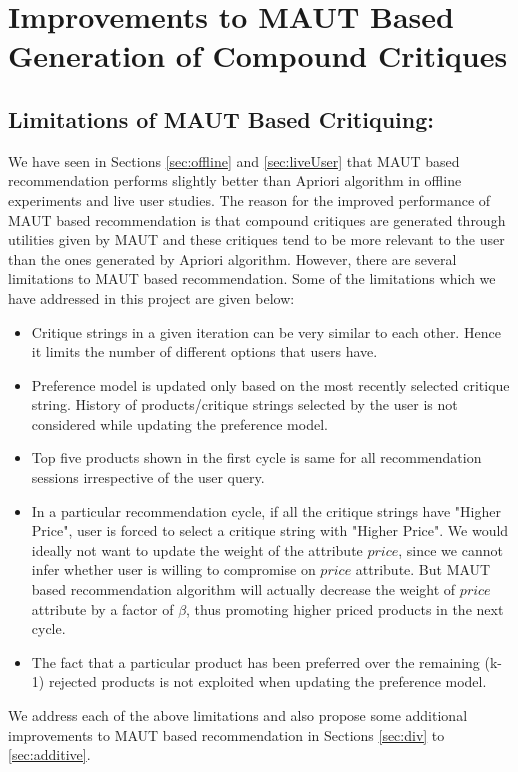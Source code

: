 \chapter{Improvements to MAUT Based Generation of Compound Critiques}
\label{chap:modifications}
\section{Limitations of MAUT Based Critiquing:}
\label{sec:limitations}

We have seen in Sections \ref{sec:offline} and \ref{sec:liveUser} that MAUT based recommendation performs slightly better than Apriori algorithm in offline experiments and live user studies.
The reason for the improved performance of MAUT based recommendation is that compound critiques are generated through utilities given by MAUT and these critiques tend to be more relevant to the user than the ones generated by Apriori algorithm.
However, there are several limitations to MAUT based recommendation. Some of the limitations which we have addressed in this project are given below:
\begin{itemize}
\setlength{\itemsep}{5pt}
\item Critique strings in a given iteration can be very similar to each other. Hence it limits the number of different options that users have.
\item Preference model is updated only based on the most recently selected critique string. History of products/critique strings selected by the user is not considered while updating the preference model.
\item Top five products shown in the first cycle is same for all recommendation sessions irrespective of the user query.
\item In a particular recommendation cycle, if all the critique strings have "Higher Price", user is forced to select a critique string with "Higher Price". We would ideally not want to update the weight of the attribute $price$, since we cannot infer whether user is willing to compromise on $price$ attribute. But MAUT based recommendation algorithm will actually decrease the weight of $price$ attribute by a factor of $\beta$, thus promoting higher priced products in the next cycle.
\item The fact that a particular product has been preferred over the remaining (k-1) rejected products is not exploited when updating the preference model.

\end{itemize}
We address each of the above limitations and also propose some additional improvements to MAUT based recommendation in Sections \ref{sec:div} to \ref{sec:additive}.














